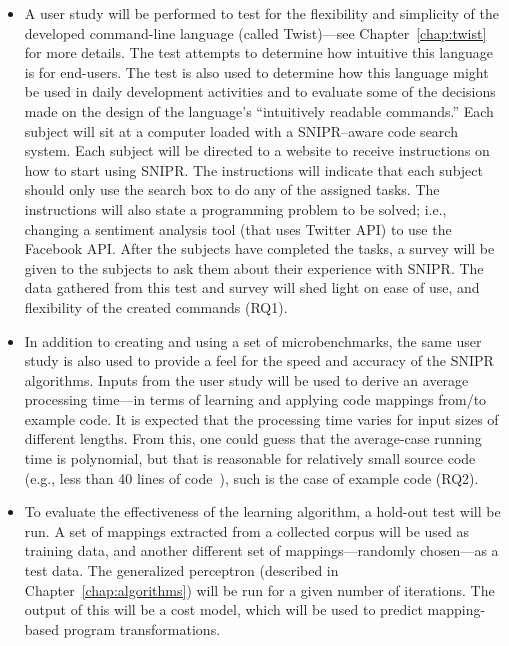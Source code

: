 \begin{itemize}  
\item A user study will be performed to test for the flexibility and simplicity of the developed command-line language (called Twist)---see Chapter~\ref{chap:twist} for more details. The test attempts to determine how intuitive this language is for end-users. The test is also used to determine how this language might be used in daily development activities and to evaluate some of the decisions made on the design of the language's ``intuitively readable commands.'' Each subject will sit at a computer loaded with a \uppercase{SnipR}--aware code search system. Each subject will be directed to a website to receive instructions on how to start using \uppercase{SnipR}. The instructions will indicate that each subject should only use the search box to do any of the assigned tasks. The instructions will also state a programming problem to be solved; i.e., changing a sentiment analysis tool (that uses Twitter API) to use the Facebook API. After the subjects have completed the tasks, a survey will be given to the subjects to ask them about their experience with \uppercase{SnipR}. The data gathered from this test and survey will shed light on ease of use, and flexibility of the created commands (RQ1).

\item In addition to creating and using a set of microbenchmarks, the same user study is also used to provide a feel for the speed and accuracy of the  \uppercase{SnipR} algorithms. Inputs from the user study will be used to derive an average processing time---in terms of learning and applying code mappings from/to example code. It is expected that the processing time varies for input sizes of different lengths. From this, one could guess that the average-case running time is polynomial, but that is reasonable for relatively small source code (e.g., less than 40 lines of code~\cite{Brandt:2009ew}), such is the case of example code (RQ2). 

\item To evaluate the effectiveness of the learning algorithm, a hold-out test will be run. A set of mappings extracted from a collected corpus will be used as training data, and another different set of mappings---randomly chosen---as a test data. The generalized perceptron (described in Chapter~\ref{chap:algorithms}) will be run for a given number of iterations. The output of this will be a cost model, which will be used to predict mapping-based program transformations.


\end{itemize}
